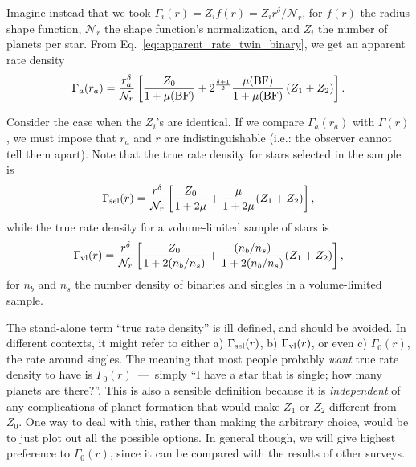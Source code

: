 \documentclass[12pt,modern]{aastex61}
\begin{document}
Imagine instead that we took $\Gamma_i(r) = Z_i f(r) = Z_i 
r^\delta/\mathcal{N}_r$, for $f(r)$ the radius shape function, 
$\mathcal{N}_r$ the shape function's normalization, and $Z_i$ the number of 
planets per star.
From Eq.~\ref{eq:apparent_rate_twin_binary}, we get an apparent rate density
\begin{equation}
\Gamma_a(r_a) = \frac{r_a^\delta}{\mathcal{N}_r} \left[
\frac{Z_0}{1+\mu({\rm BF})}
+
2^{\frac{\delta+1}{2} } \frac{\mu({\rm BF})}{1+\mu({\rm BF})} \left(Z_1 + Z_2
\right)
\right].
\label{eq:model5_apparent_rate_density}
\end{equation}

Consider the case when the $Z_i$'s are identical. If we compare 
$\Gamma_a(r_a)$ with $\Gamma(r)$, we must impose that $r_a$ and $r$ are 
indistinguishable (i.e.: the observer cannot tell them apart).
Note that the true rate density for stars selected in the sample is
\begin{equation}
\Gamma_{\rm sel}(r) = \frac{r^\delta}{\mathcal{N}_r} \left[
\frac{Z_0}{1+2\mu} + \frac{\mu}{1+2\mu} (Z_1+Z_2)
\right],
\end{equation}
while the true rate density for a volume-limited sample of stars is
\begin{equation}
\Gamma_{\rm vl}(r) = \frac{r^\delta}{\mathcal{N}_r} \left[
\frac{Z_0}{1+2(n_b/n_s)} + \frac{(n_b/n_s)}{1+2(n_b/n_s)} (Z_1+Z_2)
\right],
\end{equation}
for $n_b$ and $n_s$ the number density of binaries and singles in a 
volume-limited sample.

The stand-alone term ``true rate density'' is ill defined, and should 
be avoided.
In different contexts, it might refer to either a) 
$\Gamma_{\rm sel}(r)$, b) $\Gamma_{\rm vl}(r)$, or even c) $\Gamma_0(r)$, the 
rate around singles.
The meaning that most people probably {\it want} true rate density to have is
$\Gamma_0(r)$~---~simply ``I have a star that is single; how many planets are 
there?''.
This is also a sensible definition because it is {\it independent} of any 
complications of planet formation that would make $Z_1$ or $Z_2$ different 
from $Z_0$.
One way to deal with this, rather than making the arbitrary choice, would be 
to just plot out all the possible options.
In general though, we will give highest preference to $\Gamma_0(r)$, since it 
can be compared with the results of other surveys.
\end{document}
